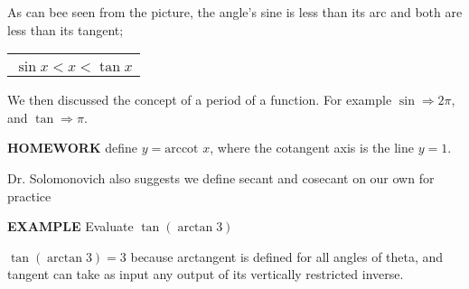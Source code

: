 \documentclass{article}
\begin{document}
\vspace{10pt}

As can bee seen from the picture, the angle's sine is less than its arc and both are less than its tangent;

\begin{center}
\begin{tabular}{|c|}
\hline\\
$\sin x<x<\tan x$\\[1em]
\hline
\end{tabular}
\end{center}

\vspace{10pt}

We then discussed the concept of a period of a function. For example $\sin\Rightarrow2\pi$, and $\tan\Rightarrow\pi$.

\vspace{10pt}

{\bf{}HOMEWORK} define $y=\mbox{arccot }x$, where the cotangent axis is the line $y=1$.

\vspace{10pt}

\begin{center}
\end{center}

\vspace{10pt}

Dr. Solomonovich also suggests we define secant and cosecant on our own for practice

\vspace{10pt}

{\bf{}EXAMPLE} Evaluate $\tan(\arctan3)$

\vspace{10pt}

 $\tan(\arctan3)=3$ because arctangent is defined for all angles of theta, and tangent can take as input any output of its vertically restricted inverse.

\vspace{10pt}
\end{document}

